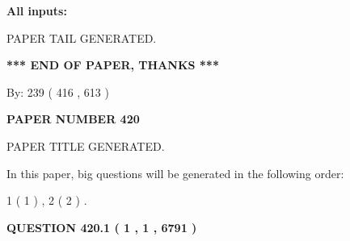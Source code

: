\documentclass{ctexart}
\begin{document}
   
   
   
\noindent{}
   
   
   
   
\noindent\vspace{0.1in}\hspace{-0.08in} {\textbf{\Large{All inputs: }}}
   
   
   
   
   
   
 \vspace{0.2in}
 
   
   
\vspace{2.0in} PAPER TAIL GENERATED.
   
   
   
   
\vspace{1.0in} 
{\textbf{\large{ *** END OF PAPER, THANKS *** }}} 
   
   
\hspace{1.0in} By: 
 239 ( 416 ,  613 )
   
   
   
   
\newpage 
\setcounter{page}{ 
   420001 } 
   
   
   
   
 {\textbf{ \Large{ PAPER NUMBER  420  }}}
   
   
\vspace{0.2in}
   
   
   
   
   
   
   
   
 \vspace{0.2in}
 
 
 
 
   
   
 PAPER TITLE GENERATED.
   
   
   
\vspace{0.2in}
   
In this paper, big questions will be generated in the following order: 
   
   
   1 ( 1 )
 ,
   2 ( 2 )
 .
  
\vspace{0.2in}
  
{\textbf{\Large{QUESTION
420.1 
 ( 1 , 1 , 6791 )
}}}
  
\end{document}

